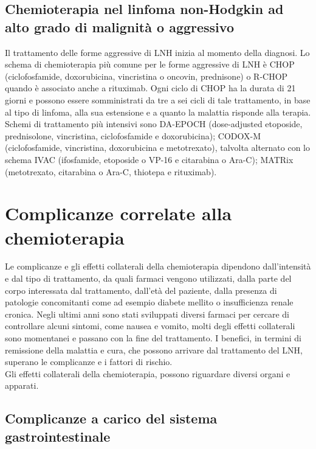 \subsection{Chemioterapia nel linfoma non-Hodgkin ad alto grado di malignità o aggressivo}

Il trattamento delle forme aggressive di LNH inizia al momento della diagnosi. 
Lo schema di chemioterapia più comune per le forme aggressive di LNH è CHOP (ciclofosfamide, doxorubicina, vincristina 
o oncovin, prednisone) o R-CHOP quando è associato anche a rituximab. Ogni ciclo di CHOP ha la durata di 21 giorni e 
possono essere somministrati da tre a sei cicli di tale trattamento, in base al tipo di linfoma, alla sua estensione 
e a quanto la malattia risponde alla terapia.
Schemi di trattamento più intensivi sono DA-EPOCH (dose-adjusted etoposide, prednisolone, vincristina, ciclofosfamide 
e doxorubicina); CODOX-M (ciclofosfamide, vincristina, doxorubicina e metotrexato), talvolta alternato con lo schema 
IVAC (ifosfamide, etoposide o VP-16 e citarabina o Ara-C); MATRix (metotrexato, citarabina o Ara-C, 
thiotepa e rituximab)\cite{HIGHGRADE}.\\

\section{Complicanze correlate alla chemioterapia}

Le complicanze e gli effetti collaterali della chemioterapia dipendono dall’intensità e dal tipo di trattamento, da 
quali farmaci vengono utilizzati, dalla parte del corpo interessata dal trattamento, dall’età del paziente, dalla 
presenza di patologie concomitanti come ad esempio diabete mellito o insufficienza renale cronica. Negli ultimi anni 
sono stati sviluppati diversi farmaci per cercare di controllare alcuni sintomi, come nausea e vomito, molti degli 
effetti collaterali sono momentanei e passano con la fine del trattamento. I benefici, in termini di remissione 
della malattia e cura, che possono arrivare dal trattamento del LNH, superano le complicanze e i fattori di rischio\cite{LLS}.\\
Gli effetti collaterali della chemioterapia, possono riguardare diversi organi e apparati.

\subsection{Complicanze a carico del sistema gastrointestinale}

